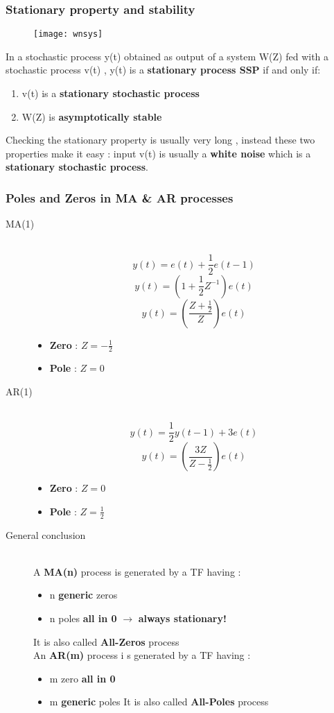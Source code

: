 \subsubsection{Stationary property and stability }
\begin{figure}[!h]
 \centering
  \texttt{[image: wnsys]}
\end{figure}
In a stochastic process y(t) obtained as output of a system W(Z) fed with a stochastic process v(t) , y(t) is a \textbf{stationary process SSP} if and only if:
\begin{enumerate}
\item v(t) is a \textbf{stationary stochastic process}
\item W(Z) is \textbf{asymptotically stable}
\end{enumerate}
Checking the stationary property is usually very long , instead these two properties make it easy : input v(t) is usually a \textbf{white noise} which is a \textbf{stationary stochastic process}.
\subsubsection{Poles and Zeros in MA \& AR processes}
\begin{description}
\item[ MA(1)]\hfill\\
$$ y(t) = e(t) + \frac{1}{2}e(t-1)$$
$$ y(t) = (1+\frac{1}{2} Z^{-1})e(t) $$
$$ y(t) = (\frac{Z+\frac{1}{2}}{Z})e(t) $$
\begin{itemize}
\item \textbf{Zero} : $ Z= -\frac{1}{2}$
\item \textbf{Pole} : $ Z= 0 $
\end{itemize}
\item[AR(1)]\hfill\\
$$ y(t) = \frac{1}{2}y(t-1)+3e(t)$$
$$ y(t) = (\frac{3Z}{Z-\frac{1}{2}})e(t) $$
\begin{itemize}
\item \textbf{Zero} : $ Z= 0$
\item \textbf{Pole} : $ Z= \frac{1}{2}$
\end{itemize}
\item[General conclusion]\hfill\\
A \textbf{MA(n)} process is generated by a TF having :
\begin{itemize}
\item n \textbf{generic} zeros
\item n poles \textbf{all in 0} $\to$ \textbf{always stationary!}
\end{itemize}
It is also called \textbf{All-Zeros} process \\
An \textbf{AR(m)} process i s generated by a TF having :
\begin{itemize}
\item m zero \textbf{all in 0}
\item m \textbf{generic} poles
It is also called \textbf{All-Poles} process
\end{itemize}
\end{description}

